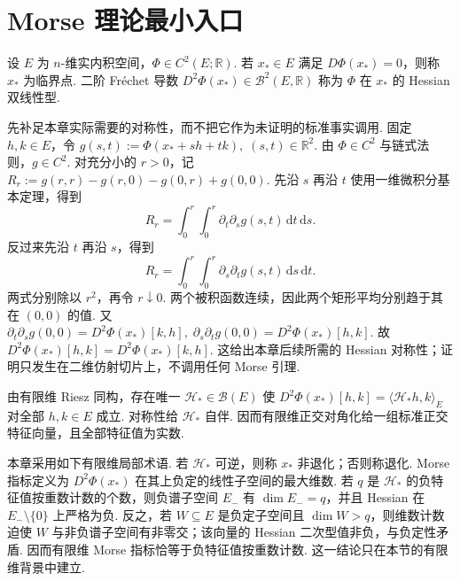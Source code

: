 \section{Morse 理论最小入口}\label{sec:iii11-morse-minimum-entry}

设 \(\displaystyle E\) 为 \(\displaystyle n\)-维实内积空间，\(\displaystyle\Phi\in C^2(E;\mathbb R)\). 若 \(\displaystyle x_*\in E\) 满足 \(\displaystyle D\Phi(x_*)=0\)，则称 \(\displaystyle x_*\) 为临界点. 二阶 Fr\'echet 导数
\(\displaystyle D^2\Phi(x_*)\in\mathcal B^2(E,\mathbb R)\)
称为 \(\displaystyle\Phi\) 在 \(\displaystyle x_*\) 的 Hessian 双线性型.

先补足本章实际需要的对称性，而不把它作为未证明的标准事实调用. 固定 \(\displaystyle h,k\in E\)，令
\(\displaystyle g(s,t):=\Phi(x_*+sh+tk), \; (s,t)\in\mathbb R^2\).
由 \(\displaystyle\Phi\in C^2\) 与链式法则，\(\displaystyle g\in C^2\). 对充分小的 \(\displaystyle r>0\)，记
\(\displaystyle R_r := g(r,r)-g(r,0)-g(0,r)+g(0,0)\).
先沿 \(\displaystyle s\) 再沿 \(\displaystyle t\) 使用一维微积分基本定理，得到
\[
R_r
=
\int_0^r\int_0^r
\partial_t\partial_s g(s,t)
\,\mathrm{d}t\,\mathrm{d}s.
\]
反过来先沿 \(\displaystyle t\) 再沿 \(\displaystyle s\)，得到
\[
R_r
=
\int_0^r\int_0^r
\partial_s\partial_t g(s,t)
\,\mathrm{d}s\,\mathrm{d}t.
\]
两式分别除以 \(\displaystyle r^2\)，再令 \(\displaystyle r\downarrow0\). 两个被积函数连续，因此两个矩形平均分别趋于其在 \(\displaystyle(0,0)\) 的值. 又
\(\displaystyle \partial_t\partial_s g(0,0) = D^2\Phi(x_*)[k,h], \; \partial_s\partial_t g(0,0) = D^2\Phi(x_*)[h,k]\).
故
\(\displaystyle D^2\Phi(x_*)[h,k] = D^2\Phi(x_*)[k,h]\).
这给出本章后续所需的 Hessian 对称性；证明只发生在二维仿射切片上，不调用任何 Morse 引理.

由有限维 Riesz 同构，存在唯一 \(\displaystyle\mathcal H_*\in\mathcal B(E)\) 使
\(\displaystyle D^2\Phi(x_*)[h,k] = \langle\mathcal H_*h,k\rangle_E\)
对全部 \(\displaystyle h,k\in E\) 成立. 对称性给 \(\displaystyle\mathcal H_*\) 自伴. 因而有限维正交对角化给一组标准正交特征向量，且全部特征值为实数.

本章采用如下有限维局部术语. 若 \(\displaystyle\mathcal H_*\) 可逆，则称 \(\displaystyle x_*\) 非退化；否则称退化. Morse 指标定义为 \(\displaystyle D^2\Phi(x_*)\) 在其上负定的线性子空间的最大维数. 若 \(\displaystyle q\) 是 \(\displaystyle\mathcal H_*\) 的负特征值按重数计数的个数，则负谱子空间 \(\displaystyle E_-\) 有 \(\displaystyle\dim E_-=q\)，并且 Hessian 在 \(\displaystyle E_-\setminus\{0\}\) 上严格为负. 反之，若 \(\displaystyle W\subseteq E\) 是负定子空间且 \(\displaystyle\dim W>q\)，则维数计数迫使 \(\displaystyle W\) 与非负谱子空间有非零交；该向量的 Hessian 二次型值非负，与负定性矛盾. 因而有限维 Morse 指标恰等于负特征值按重数计数. 这一结论只在本节的有限维背景中建立.

